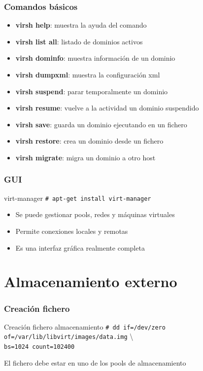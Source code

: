 \documentclass{beamer}
\begin{document}
\begin{frame}
  \frametitle{Comandos básicos}
  \begin{itemize}
    \item \textbf{virsh help}: muestra la ayuda del comando
    \item \textbf{virsh list \-\-all}: listado de dominios activos
    \item \textbf{virsh dominfo}: muestra información de un dominio
    \item \textbf{virsh dumpxml}: muestra la configuración xml
    \item \textbf{virsh suspend}: parar temporalmente un dominio
    \item \textbf{virsh resume}: vuelve a la actividad un dominio suspendido
    \item \textbf{virsh save}: guarda un dominio ejecutando en un fichero
    \item \textbf{virsh restore}: crea un dominio desde un fichero
    \item \textbf{virsh migrate}: migra un dominio a otro host
  \end{itemize}
\end{frame}

\begin{frame}
  \frametitle{GUI}
  \begin{block}{virt-manager}
    \texttt{\# apt-get install virt-manager}
  \end{block}
  \bigskip
  \begin{itemize}
    \item Se puede gestionar pools, redes y máquinas virtuales
    \item Permite conexiones locales y remotas
    \item Es una interfaz gráfica realmente completa
  \end{itemize}
\end{frame}

\section{Almacenamiento externo}

\begin{frame}
  \frametitle{Creación fichero}
  \begin{block}{Creación fichero almacenamiento}
    \small{\texttt{\# dd if=/dev/zero of=/var/lib/libvirt/images/data.img} \textbackslash  \\
    \texttt{bs=1024 count=102400}}
  \end{block}
  \bigskip
  \begin{center}
    El fichero debe estar en uno de los pools de almacenamiento
  \end{center}
\end{frame}
\end{document}
